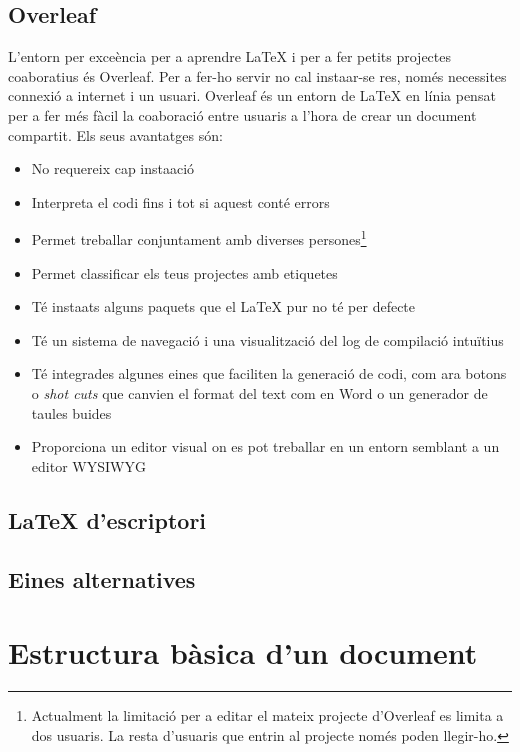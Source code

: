 \documentclass[15pt,twosides,onecolumn,openany]{book}
\begin{document}
\subsection{Overleaf}
L'entorn per exce\lgem ència per a aprendre LaTeX i per a fer petits projectes co\lgem aboratius és Overleaf. Per a fer-ho servir no cal insta\lgem ar-se res, només necessites connexió a internet i un usuari. Overleaf és un entorn de LaTeX en línia pensat per a fer més fàcil la co\lgem aboració entre usuaris a l'hora de crear un document compartit. Els seus avantatges són:
\begin{itemize}
    \item No requereix cap insta\lgem ació

    \item Interpreta el codi fins i tot si aquest conté errors

    \item Permet treballar conjuntament amb diverses persones\footnote{Actualment la limitació per a editar el mateix projecte d'Overleaf es limita a dos usuaris. La resta d'usuaris que entrin al projecte només poden llegir-ho.}

    \item Permet classificar els teus projectes amb etiquetes

    \item Té insta\lgem ats alguns paquets que el LaTeX pur no té per defecte

    \item Té un sistema de navegació i una visualització del log de compilació intuïtius 

    \item Té integrades algunes eines que faciliten la generació de codi, com ara botons o \textit{shot cuts} que canvien el format del text com en Word o un generador de taules buides

    \item Proporciona un editor visual on es pot treballar en un entorn semblant a un editor WYSIWYG
\end{itemize}
\subsection{LaTeX d'escriptori}
\subsection{Eines alternatives}

\section{Estructura bàsica d'un document}
\end{document}
